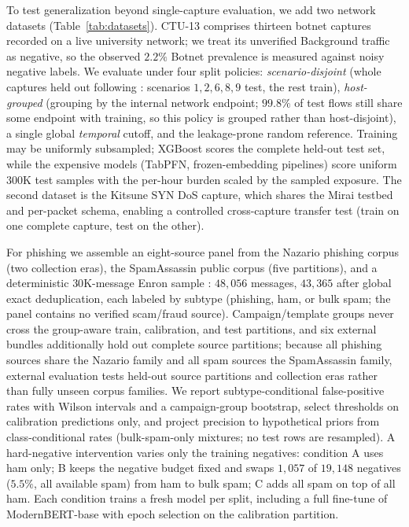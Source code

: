 \documentclass{jmlr}
\begin{document}
To test generalization beyond single-capture evaluation, we add two network datasets (Table~\ref{tab:datasets}). CTU-13 \citep{garcia2014empirical} comprises thirteen botnet captures recorded on a live university network; we treat its unverified Background traffic as negative, so the observed $2.2\%$ Botnet prevalence is measured against noisy negative labels. We evaluate under four split policies: \emph{scenario-disjoint} (whole captures held out following \citet{garcia2014empirical}: scenarios $1, 2, 6, 8, 9$ test, the rest train), \emph{host-grouped} (grouping by the internal network endpoint; $99.8\%$ of test flows still share some endpoint with training, so this policy is grouped rather than host-disjoint), a single global \emph{temporal} cutoff, and the leakage-prone random reference. Training may be uniformly subsampled; XGBoost scores the complete held-out test set, while the expensive models (TabPFN, frozen-embedding pipelines) score uniform $300$K test samples with the per-hour burden scaled by the sampled exposure. The second dataset is the Kitsune SYN DoS capture, which shares the Mirai testbed and per-packet schema, enabling a controlled cross-capture transfer test (train on one complete capture, test on the other).

For phishing we assemble an eight-source panel from the Nazario phishing corpus \citep{nazario2005phishing} (two collection eras), the SpamAssassin public corpus \citep{spamassassin2003corpus} (five partitions), and a deterministic $30$K-message Enron sample \citep{klimt2004enron}: $48{,}056$ messages, $43{,}365$ after global exact deduplication, each labeled by subtype (phishing, ham, or bulk spam; the panel contains no verified scam/fraud source). Campaign/template groups never cross the group-aware train, calibration, and test partitions, and six external bundles additionally hold out complete source partitions; because all phishing sources share the Nazario family and all spam sources the SpamAssassin family, external evaluation tests held-out source partitions and collection eras rather than fully unseen corpus families. We report subtype-conditional false-positive rates with Wilson intervals and a campaign-group bootstrap, select thresholds on calibration predictions only, and project precision to hypothetical priors from class-conditional rates (bulk-spam-only mixtures; no test rows are resampled). A hard-negative intervention varies only the training negatives: condition A uses ham only; B keeps the negative budget fixed and swaps $1{,}057$ of $19{,}148$ negatives ($5.5\%$, all available spam) from ham to bulk spam; C adds all spam on top of all ham. Each condition trains a fresh model per split, including a full fine-tune of ModernBERT-base with epoch selection on the calibration partition.
\end{document}
